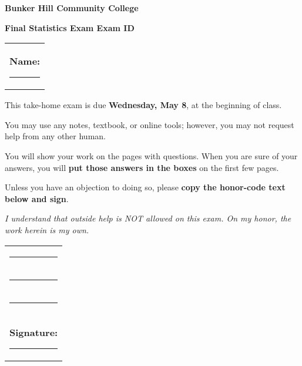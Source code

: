 \documentclass[12pt]{article}
\makeatletter
\newcommand{\myID}{\@ID}
\newcommand{\myDate}{\@Date}
\makeatother
\begin{document}
\thispagestyle{empty}
{\sf
\textbf{\LARGE{Bunker Hill Community College}}

\textbf{\large{Final Statistics Exam \myDate \hfill Exam ID \myID}}

\vspace*{2cm}

\begin{center}
\begin{tabular}{p{16cm}}
\textbf{Name:} \hrule \\[1.5cm]
\end{tabular}
\end{center}

This take-home exam is due {\bf Wednesday, May 8}, at the beginning of class.

You may use any notes, textbook, or online tools; however, you may not request help from any other human.

You will show your work on the pages with questions. When you are sure of your answers, you will {\bf put those answers in the boxes} on the first few pages.

Unless you have an objection to doing so, please {\bf copy the honor-code text below and sign}. 

\vspace{20pt}
\begin{center}
\emph{I understand that outside help is NOT allowed on this exam. On my honor, the work herein is my own.}
\end{center}

\vspace{1.5cm}
\begin{center}
\begin{tabular}{p{16cm}}
\hrule  \\[1.4cm]
\hrule  \\[1.4cm]
\hrule  \\[1.4cm]
\textbf{Signature:} \hrule 
\end{tabular}
\end{center}

\newpage
}
\end{document}
